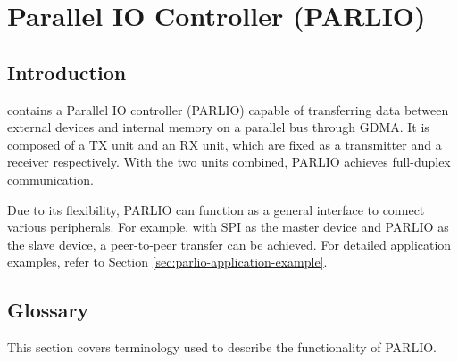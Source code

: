 \documentclass[main\_\_EN.tex]{subfiles}
\begin{document}

\ifglobal
\else
    {\let\clearpage\relax \listoftodos}
    {\let\clearpage\relax \listofdonetodos}
    \tableofcontents
\fi



\hypertarget{parlio}{}
\chapter{Parallel IO Controller (PARLIO)}
\label{mod:parlio}



\section{Introduction}
\chipname{} contains a Parallel IO controller (PARLIO) capable of transferring data between external devices and internal memory on a parallel bus through GDMA. It is composed of a TX unit and an RX unit, which are fixed as a transmitter and a receiver respectively. With the two units combined, PARLIO achieves full-duplex communication.

Due to its flexibility, PARLIO can function as a general interface to connect various peripherals. For example, with SPI as the master device and PARLIO as the slave device, a peer-to-peer transfer can be achieved. For detailed application examples, refer to Section \ref{sec:parlio-application-example}.


\section{Glossary}
This section covers terminology used to describe the functionality of PARLIO.
\end{document}
